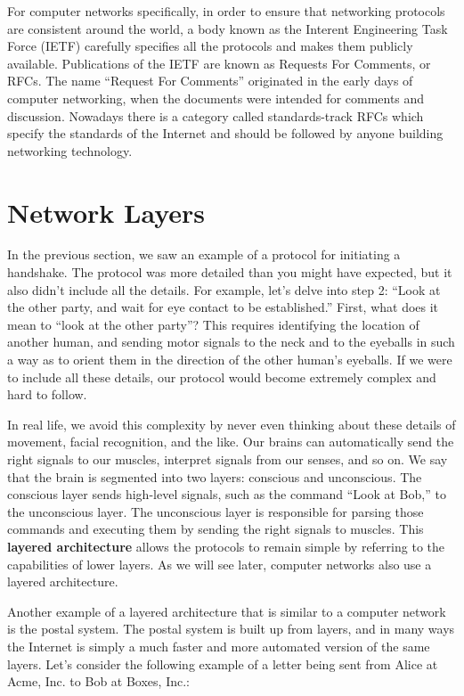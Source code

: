 For computer networks specifically, in order to ensure that networking protocols are consistent around the world, a body known as the Interent Engineering Task Force (IETF) carefully specifies all the protocols and makes them publicly available. Publications of the IETF are known as Requests For Comments, or RFCs. The name ``Request For Comments'' originated in the early days of computer networking, when the documents were intended for comments and discussion. Nowadays there is a category called standards-track RFCs which specify the standards of the Internet and should be followed by anyone building networking technology.

\section{Network Layers}\label{sec:network:layers}

In the previous section, we saw an example of a protocol for initiating a handshake. The protocol was more detailed than you might have expected, but it also didn't include all the details. For example, let's delve into step 2: ``Look at the other party, and wait for eye contact to be established.'' First, what does it mean to ``look at the other party''? This requires identifying the location of another human, and sending motor signals to the neck and to the eyeballs in such a way as to orient them in the direction of the other human's eyeballs. If we were to include all these details, our protocol would become extremely complex and hard to follow.

In real life, we avoid this complexity by never even thinking about these details of movement, facial recognition, and the like. Our brains can automatically send the right signals to our muscles, interpret signals from our senses, and so on. We say that the brain is segmented into two layers: conscious and unconscious. The conscious layer sends high-level signals, such as the command ``Look at Bob,'' to the unconscious layer. The unconscious layer is responsible for parsing those commands and executing them by sending the right signals to muscles. This \textbf{layered architecture} allows the protocols to remain simple by referring to the capabilities of lower layers. As we will see later, computer networks also use a layered architecture.

Another example of a layered architecture that is similar to a computer network is the postal system. The postal system is built up from layers, and in many ways the Internet is simply a much faster and more automated version of the same layers. Let's consider the following example of a letter being sent from Alice at Acme, Inc. to Bob at Boxes, Inc.:

